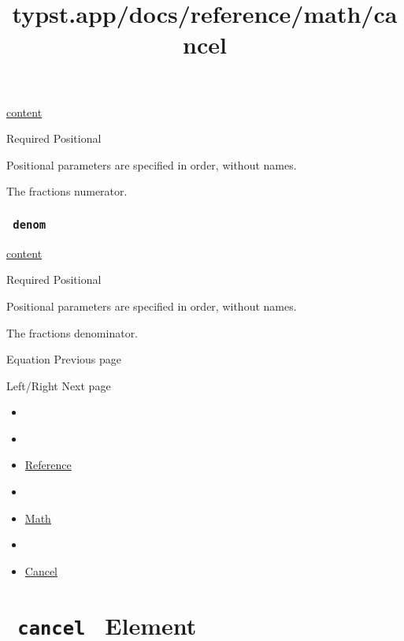 \href{/docs/reference/foundations/content/}{content}

{Required} {{ Positional }}

\label{parameters-num-positional-tooltip}
Positional parameters are specified in order, without names.

The fraction\textquotesingle s numerator.

\subsubsection{\texorpdfstring{\texttt{\ denom\ }}{ denom }}\label{parameters-denom}

\href{/docs/reference/foundations/content/}{content}

{Required} {{ Positional }}

\label{parameters-denom-positional-tooltip}
Positional parameters are specified in order, without names.

The fraction\textquotesingle s denominator.

\href{/docs/reference/math/equation/}{\pandocbounded{}}

{ Equation } { Previous page }

\href{/docs/reference/math/lr/}{\pandocbounded{}}

{ Left/Right } { Next page }


\title{typst.app/docs/reference/math/cancel}

\begin{itemize}
\tightlist
\item
  \href{/docs}{}
\item
  
\item
  \href{/docs/reference/}{Reference}
\item
  
\item
  \href{/docs/reference/math/}{Math}
\item
  
\item
  \href{/docs/reference/math/cancel/}{Cancel}
\end{itemize}

\section{\texorpdfstring{\texttt{\ cancel\ } {{ Element
}}}{ cancel   Element }}\label{summary}

